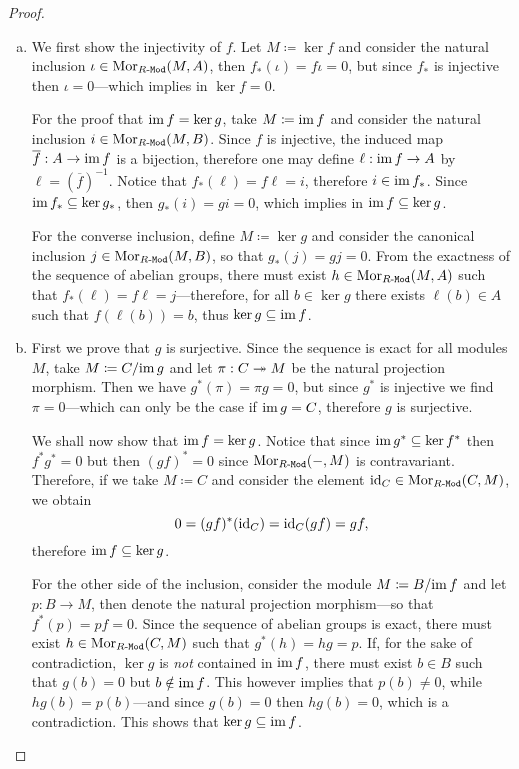 \begin{proof}
\begin{enumerate}[(a)]\setlength\itemsep{0em}
\item We first show the injectivity of \(f\). Let \(M \coloneq \ker f\) and
  consider the natural inclusion \(\iota \in \operatorname{Mor}_{{R\text{-}\texttt{Mod}}}(M, A)\), then
  \(f_{*}(\iota) = f \iota = 0\), but since \(f_{*}\) is injective then
  \(\iota = 0\)---which implies in \(\ker f = 0\).

  For the proof that \(\operatorname{im} f = \ker g\), take \(M \coloneq \operatorname{im} f\) and consider
  the natural inclusion \(i \in \operatorname{Mor}_{{R\text{-}\texttt{Mod}}}(M, B)\). Since \(f\) is
  injective, the induced map \(\overline{f}: A \to \operatorname{im} f\) is a bijection,
  therefore one may define \(\ell: \operatorname{im} f \to A\) by
  \(\ell = (\overline{f})^{-1}\). Notice that \(f_{*}(\ell) = f \ell = i\),
  therefore \(i \in \operatorname{im} f_{*}\). Since \(\operatorname{im} f_{*} \subseteq \ker g_{*}\), then
  \(g_{*}(i) = g i = 0\), which implies in \(\operatorname{im} f \subseteq \ker g\).

  For the converse inclusion, define \(M \coloneq \ker g\) and consider the
  canonical inclusion \(j \in \operatorname{Mor}_{{R\text{-}\texttt{Mod}}}(M, B)\), so that
  \(g_{*}(j) = g j = 0\). From the exactness of the sequence of abelian groups,
  there must exist \(h \in \operatorname{Mor}_{{R\text{-}\texttt{Mod}}}(M, A)\) such that
  \(f_{*}(\ell) = f \ell = j\)---therefore, for all \(b \in \ker g\) there
  exists \(\ell(b) \in A\) such that \(f(\ell(b)) = b\), thus
  \(\ker g \subseteq \operatorname{im} f\).

\item First we prove that \(g\) is surjective. Since the sequence is exact for
  all modules \(M\), take \(M \coloneq C/{\operatorname{im} g}\) and let \(\pi: C \twoheadrightarrow M\) be
  the natural projection morphism. Then we have \(g^{*}(\pi) = \pi g = 0\), but
  since \(g^{*}\) is injective we find \(\pi = 0\)---which can only be the case
  if \(\operatorname{im} g = C\), therefore \(g\) is surjective.

  We shall now show that \(\operatorname{im} f = \ker g\). Notice that since \(\operatorname{im} g^{*}
  \subseteq \ker f^{*}\) then \(f^{*} g^{*} = 0\) but then \((g f)^{*} = 0\)
  since \(\operatorname{Mor}_{{R\text{-}\texttt{Mod}}}(-, M)\) is contravariant. Therefore, if we take \(M
  \coloneq C\) and consider the element \(\operatorname{id}_C \in \operatorname{Mor}_{{R\text{-}\texttt{Mod}}}(C, M)\), we
  obtain
  \[
  0 = (g f)^{*}(\operatorname{id}_C) = \operatorname{id}_C (g f) = g f,
  \]
  therefore \(\operatorname{im} f \subseteq \ker g\).

  For the other side of the inclusion, consider the module
  \(M \coloneq B/{\operatorname{im} f}\) and let \(p: B \to M\), then  denote the natural
  projection morphism---so that \(f^{*}(p) = p f = 0\). Since the sequence of
  abelian groups is exact, there must exist \(h \in \operatorname{Mor}_{{R\text{-}\texttt{Mod}}}(C, M)\) such
  that \(g^{*}(h) = h g = p\). If, for the sake of contradiction, \(\ker g\) is
  \emph{not} contained in \(\operatorname{im} f\), there must exist \(b \in B\) such that
  \(g(b) = 0\) but \(b \notin \operatorname{im} f\). This however implies that \(p(b) \neq
  0\), while \(h g(b) = p(b)\)---and since \(g(b) = 0\) then \(h g (b) = 0\),
  which is a contradiction. This shows that \(\ker g \subseteq \operatorname{im} f\).
\end{enumerate}
\end{proof}

